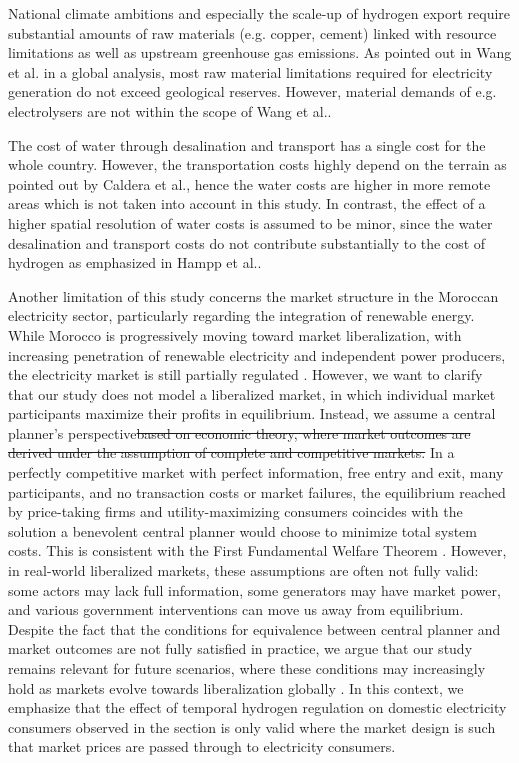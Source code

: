 \documentclass[5p,numafflabel]{elsarticle}
\providecommand{\DIFaddtex}[1]{{\protect\color{blue}\uwave{#1}}} %
\providecommand{\DIFdeltex}[1]{{\protect\color{red}\sout{#1}}}                      %
\providecommand{\DIFaddbegin}{} %
\providecommand{\DIFaddend}{} %
\providecommand{\DIFdelbegin}{} %
\providecommand{\DIFdelend}{} %
\providecommand{\DIFadd}[1]{\texorpdfstring{\DIFaddtex{#1}}{#1}} %
\providecommand{\DIFdel}[1]{\texorpdfstring{\DIFdeltex{#1}}{}} %
\newcommand{\DIFscaledelfig}{0.5}
\newlength{\DIFdelgraphicswidth} %
\newlength{\DIFdelgraphicsheight} %
\newcommand{\DIFaddincludegraphics}[2][]{{\color{blue}\fbox{\DIFOincludegraphics[#1]{#2}}}} %
\newcommand{\DIFdelincludegraphics}[2][]{%
\sbox{\DIFdelgraphicsbox}{\DIFOincludegraphics[#1]{#2}}%
\settoboxwidth{\DIFdelgraphicswidth}{\DIFdelgraphicsbox} %
\settoboxtotalheight{\DIFdelgraphicsheight}{\DIFdelgraphicsbox} %
\scalebox{\DIFscaledelfig}{%
\parbox[b]{\DIFdelgraphicswidth}{\usebox{\DIFdelgraphicsbox}\\[-\baselineskip] \rule{\DIFdelgraphicswidth}{0em}}\llap{\resizebox{\DIFdelgraphicswidth}{\DIFdelgraphicsheight}{%
\setlength{\unitlength}{\DIFdelgraphicswidth}%
\begin{picture}(1,1)%
\thicklines\linethickness{2pt} %
{\color[rgb]{1,0,0}\put(0,0){\framebox(1,1){}}}%
{\color[rgb]{1,0,0}\put(0,0){\line( 1,1){1}}}%
{\color[rgb]{1,0,0}\put(0,1){\line(1,-1){1}}}%
\end{picture}%
}\hspace*{3pt}}} %
} %
\DeclareRobustCommand{\DIFaddbegin}{\DIFOaddbegin \let\includegraphics\DIFaddincludegraphics} %
\DeclareRobustCommand{\DIFaddend}{\DIFOaddend \let\includegraphics\DIFOincludegraphics} %
\DeclareRobustCommand{\DIFdelbegin}{\DIFOdelbegin \let\includegraphics\DIFdelincludegraphics} %
\DeclareRobustCommand{\DIFdelend}{\DIFOaddend \let\includegraphics\DIFOincludegraphics} %
\begin{document}
National climate ambitions and especially the scale-up of hydrogen export require substantial amounts of raw materials (e.g. copper, cement) linked with resource limitations as well as upstream greenhouse gas emissions. As pointed out in Wang et al.\cite{Wang2023} in a global analysis, most raw material limitations required for electricity generation do not exceed geological reserves. However, material demands of e.g. electrolysers are not within the scope of Wang et al.\cite{Wang2023}.

The cost of water through desalination and transport has a single cost for the whole country. However, the transportation costs highly depend on the terrain as pointed out by Caldera et al.\cite{Caldera2016}, hence the water costs are higher in more remote areas which is not taken into account in this study. In contrast, the effect of a higher spatial resolution of water costs is assumed to be minor, since the water desalination and transport costs do not contribute substantially to the cost of hydrogen as emphasized in Hampp et al.\cite{Hampp2023}.

Another limitation of this study concerns the market structure in the Moroccan electricity sector, particularly regarding the integration of renewable energy. While Morocco is progressively moving toward market liberalization, with increasing penetration of renewable electricity and independent power producers, the electricity market is still partially regulated \cite{Bentaibi2021}. However, we want to clarify that our study does not model a liberalized market, in which individual market participants maximize their profits in equilibrium.
Instead, we assume a central planner’s perspective\DIFdelbegin \DIFdel{based on economic theory, where market outcomes are derived under the assumption of complete and competitive markets.
}\DIFdelend \DIFaddbegin \DIFadd{.
}\DIFaddend In a perfectly competitive market with perfect information, free entry and exit, many participants, and no transaction costs or market failures, the equilibrium reached by price-taking firms and utility-maximizing consumers coincides with the solution a benevolent central planner would choose to minimize total system costs. This is consistent with the First Fundamental Welfare Theorem \cite{Feldman2017, Tan2022}.
However, in real-world liberalized markets, these assumptions are often not fully valid: some actors may lack full information, some generators may have market power, and various government interventions can move us away from equilibrium.
Despite the fact that the conditions for equivalence between central planner and market outcomes are not fully satisfied in practice, we argue that our study remains relevant
for future scenarios, where these conditions may increasingly hold as markets evolve towards liberalization globally \cite{Fatras2022, Faia2024, Xu2020, Fattouh2021}.
In this context, we emphasize that the effect of temporal hydrogen regulation on domestic electricity consumers observed in the section  is only valid where the market design is such that market prices are passed through to electricity consumers.
\end{document}
